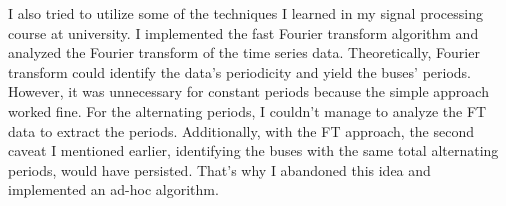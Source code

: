 \documentclass[12pt,a4paper]{article}
\begin{document}
I also tried to utilize some of the techniques I learned in my signal processing
course at university. I implemented the fast Fourier transform algorithm and
analyzed the Fourier transform of the time series data. Theoretically, Fourier
transform could identify the data's periodicity and yield the buses' periods.
However, it was unnecessary for constant periods because the simple approach
worked fine. For the alternating periods, I couldn't manage to analyze the FT
data to extract the periods. Additionally, with the FT approach, the second
caveat I mentioned earlier, identifying the buses with the same total
alternating periods, would have persisted. That's why I abandoned this idea and
implemented an ad-hoc algorithm.

%
\end{document}
